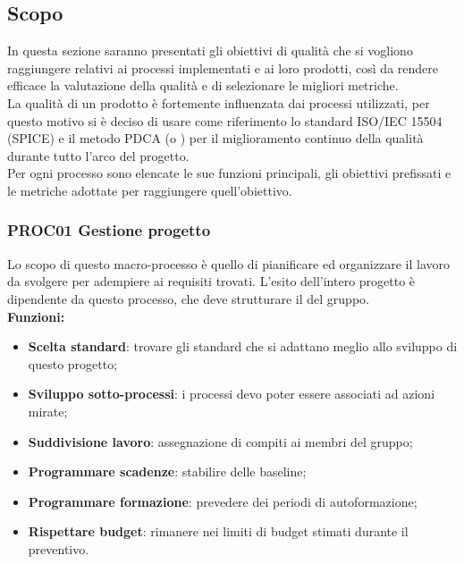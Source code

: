 \documentclass[../piano_di_qualifica.tex]{subfiles}
\begin{document}
\subsection{Scopo}
In questa sezione saranno presentati gli obiettivi di qualità che si vogliono raggiungere relativi ai processi implementati e ai loro prodotti, così da rendere efficace la valutazione della qualità e di selezionare le migliori metriche.\\
La qualità di un prodotto è fortemente influenzata dai processi utilizzati, per questo motivo si è deciso di usare come riferimento lo standard ISO/IEC 15504 (SPICE)  e il metodo PDCA (o ) per il miglioramento continuo della qualità durante tutto l'arco del progetto.\\
Per ogni processo sono elencate le sue funzioni principali, gli obiettivi prefissati e le metriche adottate per raggiungere quell’obiettivo.

\subsubsection{PROC01 Gestione progetto}
Lo scopo di questo macro-processo è quello di pianificare ed organizzare il lavoro da svolgere per adempiere ai requisiti trovati. L'esito dell'intero progetto è dipendente da questo processo, che deve strutturare il  del gruppo.\\

\setlength{\parindent}{0pt}\textbf{Funzioni:}
\smallbreak
\begin{itemize}
	\item \textbf{Scelta standard}: trovare gli standard che si adattano meglio allo sviluppo di questo progetto;
	\item \textbf{Sviluppo sotto-processi}: i processi devo poter essere associati ad azioni mirate;
	\item \textbf{Suddivisione lavoro}: assegnazione di compiti ai membri del gruppo;
	\item \textbf{Programmare scadenze}: stabilire delle baseline;
	\item \textbf{Programmare formazione}: prevedere dei periodi di autoformazione;
	\item \textbf{Rispettare budget}: rimanere nei limiti di budget stimati durante il preventivo.
\end{itemize}
\end{document}
